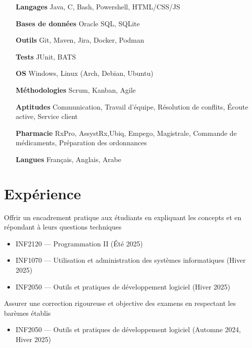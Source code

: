 \documentclass[letterpaper,10pt]{article}
\begin{document}
  \begin{multicols}{2}
    \begin{itemize}[itemsep=-2px, parsep=5pt, leftmargin=75pt]
      \item[\textbf{Langages}] Java, C, Bash, Powershell, HTML/CSS/JS
      \item[\textbf{Bases de données}] Oracle SQL, SQLite
      \item[\textbf{Outils}] Git, Maven, Jira, Docker, Podman
      \item[\textbf{Tests}] JUnit, BATS
      \item[\textbf{OS}]  Windows, Linux (Arch, Debian, Ubuntu)
      \item[\textbf{Méthodologies}]  Scrum, Kanban, Agile
      \item[\textbf{Aptitudes}]  Communication, Travail d'équipe, Résolution de conflits, Écoute active, Service client
      \item[\textbf{Pharmacie}]  RxPro, AssystRx,Ubiq, Empego, Magistrale, Commande de médicaments, Préparation des ordonnances
      \item[\textbf{Langues}]  Français, Anglais, Arabe
    \end{itemize}
  \end{multicols}


  \section{Expérience}

  \begin{resume_list}
    \item Offrir un encadrement pratique aux étudiants en expliquant les concepts et en répondant à leurs questions techniques
    \begin{itemize}
        \item INF2120 — Programmation II (Été 2025)
        \item INF1070 — Utilisation et administration des systèmes informatiques (Hiver 2025)
        \item INF2050 — Outils et pratiques de développement logiciel (Hiver 2025)
    \end{itemize}
  \vspace{3pt}
  
    \item Assurer une correction rigoureuse et objective des examens en respectant les barèmes établis
    \begin{itemize}
        \item INF2050 — Outils et pratiques de développement logiciel (Automne 2024, Hiver 2025)
    \end{itemize}
  \end{resume_list}
\end{document}
